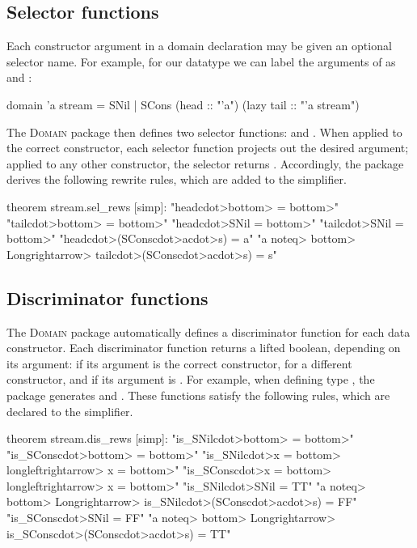 \subsection{Selector functions}

Each constructor argument in a domain declaration may be given an optional selector name. For example, for our  datatype we can label the arguments of  as  and :

\begin{isacode}
domain 'a stream = SNil | SCons (head :: "'a") (lazy tail :: "'a stream")
\end{isacode}
%
The \textsc{Domain} package then defines two selector functions:  and . When applied to the correct constructor, each selector function projects out the desired argument; applied to any other constructor, the selector returns . Accordingly, the package derives the following rewrite rules, which are added to the simplifier.

\begin{isacode}
theorem stream.sel_rews [simp]:
  "head\<cdot>\<bottom> = \<bottom>"
  "tail\<cdot>\<bottom> = \<bottom>"
  "head\<cdot>SNil = \<bottom>"
  "tail\<cdot>SNil = \<bottom>"
  "head\<cdot>(SCons\<cdot>a\<cdot>s) = a"
  "a \<noteq> \<bottom> \<Longrightarrow> tail\<cdot>(SCons\<cdot>a\<cdot>s) = s"
\end{isacode}

\subsection{Discriminator functions}

The \textsc{Domain} package automatically defines a discriminator function for each data constructor. Each discriminator function returns a lifted boolean, depending on its argument:  if its argument is the correct constructor,  for a different constructor, and  if its argument is . For example, when defining type , the package generates  and . These functions satisfy the following rules, which are declared to the simplifier.

\begin{isacode}
theorem stream.dis_rews [simp]:
  "is_SNil\<cdot>\<bottom> = \<bottom>"
  "is_SCons\<cdot>\<bottom> = \<bottom>"
  "is_SNil\<cdot>x = \<bottom> \<longleftrightarrow> x = \<bottom>"
  "is_SCons\<cdot>x = \<bottom> \<longleftrightarrow> x = \<bottom>"
  "is_SNil\<cdot>SNil = TT"
  "a \<noteq> \<bottom> \<Longrightarrow> is_SNil\<cdot>(SCons\<cdot>a\<cdot>s) = FF"
  "is_SCons\<cdot>SNil = FF"
  "a \<noteq> \<bottom> \<Longrightarrow> is_SCons\<cdot>(SCons\<cdot>a\<cdot>s) = TT"
\end{isacode}


